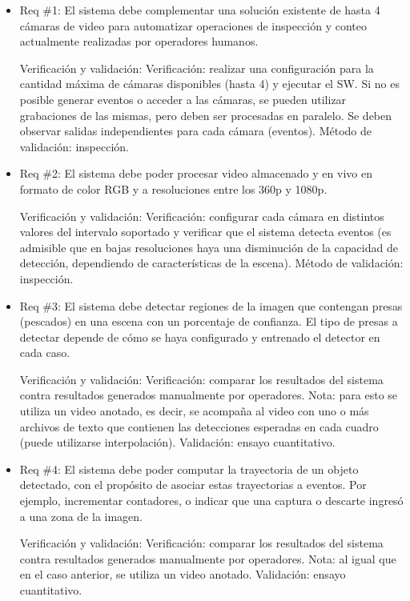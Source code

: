 \documentclass[11pt]{charter}
\begin{document}
\begin{itemize}  %

\item Req \#1: El sistema debe complementar una solución existente de hasta 4 cámaras de video para automatizar operaciones de inspección y conteo actualmente realizadas por operadores humanos.

Verificación y validación:
\subitem Verificación: realizar una configuración para la cantidad máxima de cámaras disponibles (hasta 4) y ejecutar el SW. Si no es posible generar eventos o acceder a las cámaras, se pueden utilizar grabaciones de las mismas, pero deben ser procesadas en paralelo. Se deben observar salidas independientes para cada cámara (eventos).
\subitem Método de validación: inspección.

\item Req \#2: El sistema debe poder procesar video almacenado y en vivo en formato de color RGB y a resoluciones entre los 360p y 1080p. 

Verificación y validación:
\subitem Verificación: configurar cada cámara en distintos valores del intervalo soportado y verificar que el sistema detecta eventos (es admisible que en bajas resoluciones haya una disminución de la capacidad de detección, dependiendo de características de la escena).
\subitem Método de validación: inspección.

\item Req \#3: El sistema debe detectar regiones de la imagen que contengan presas (pescados) en una escena con un porcentaje de confianza. El tipo de presas a detectar depende de cómo se haya configurado y entrenado el detector en cada caso.

Verificación y validación:
\subitem Verificación: comparar los resultados del sistema contra resultados generados manualmente por operadores. Nota: para esto se utiliza un video anotado, es decir, se acompaña al video con uno o más archivos de texto que contienen las detecciones esperadas en cada cuadro (puede utilizarse interpolación).
\subitem Validación: ensayo cuantitativo.

\item Req \#4: El sistema debe poder computar la trayectoria de un objeto detectado, con el propósito de asociar estas trayectorias a eventos. Por ejemplo, incrementar contadores, o indicar que una captura o descarte ingresó a una zona de la imagen.

Verificación y validación:
\subitem Verificación: comparar los resultados del sistema contra resultados generados manualmente por operadores. Nota: al igual que en el caso anterior, se utiliza un video anotado.
\subitem Validación: ensayo cuantitativo.


\end{itemize}
\end{document}
